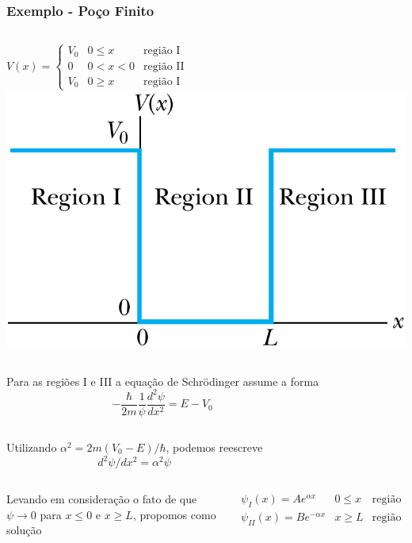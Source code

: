 \documentclass[12pt,brazil,table]{beamer}
\begin{document}
\begin{frame}
  \frametitle{Exemplo - Poço Finito}
  
  \fontsize{10pt}{11pt}\selectfont
  \begin{columns}
  $
    V(x) = \left\{ \begin{array}{lll}
            V_0 & 0\leq x &\text{região I}\\
            0 & 0 < x < 0 &\text{região II}\\
            V_0 & 0\geq x &\text{região I}
           \end{array}\right.
  $
  \hspace*{-0.5cm}\centering \includegraphics[height=3.cm]{figuras/fig20b}
  \end{columns}
  
  \vspace{0.25cm}
  \begin{columns}
    Para as regiões I e III a equação de Schrödinger assume a forma
    \[
      -\dfrac{\hbar}{2m}\dfrac{1}{\psi}\dfrac{d^2\psi}{dx^2}=E-V_0
    \]
  \end{columns}
  
  
  \vspace{0.25cm}
  \begin{columns}
    Utilizando $\alpha^2=2m\left( V_0 - E \right)/\hbar$, podemos reescreve
  \hspace*{1cm}
    \[
      d^2\psi / dx^2 = \alpha ^2\psi
  \]
  \end{columns}  
  
  \vspace{0.25cm}
  \begin{columns}
    Levando em consideração o fato de que $\psi\to 0$ para $x\leq 0$ e $x \geq L$, propomos como solução
  
  \[
      \begin{array}{lll}
        \psi_I(x) = Ae^{\alpha x}  & 0\leq x &\text{região I}\\
        \psi_{II}(x) = Be^{-\alpha x} & x \geq L &\text{região III}
           \end{array}
  \]
  \end{columns}
  
\end{frame}
\end{document}
